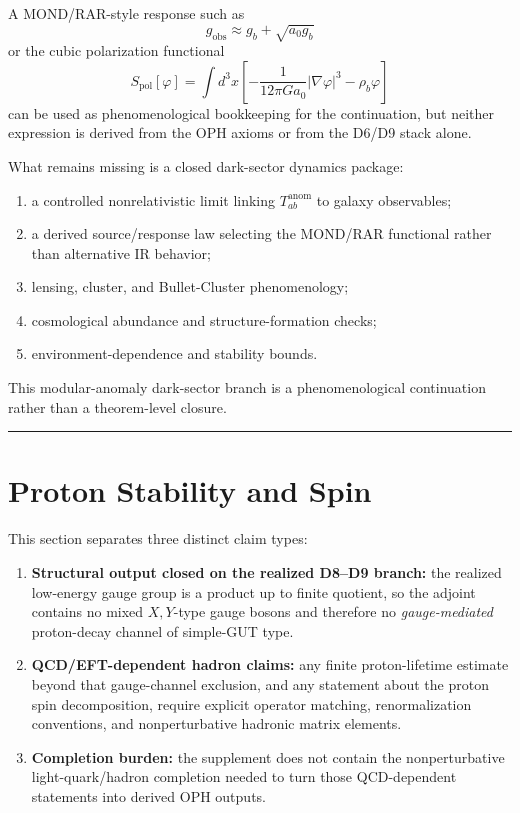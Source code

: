 A MOND/RAR-style response such as \[g_{\text{obs}} \approx g_b + \sqrt{a_0 g_b}\]
or the cubic polarization functional \[S_{\text{pol}}[\varphi] = \int d^3x \left[-\frac{1}{12\pi G a_0}|\nabla\varphi|^3 - \rho_b \varphi\right]\]
can be used as phenomenological bookkeeping for the continuation, but neither expression is derived from the OPH axioms or from the D6/D9 stack alone.

What remains missing is a closed dark-sector dynamics package:
\begin{enumerate}
\item a controlled nonrelativistic limit linking \(T_{ab}^{\text{anom}}\) to galaxy observables;
\item a derived source/response law selecting the MOND/RAR functional rather than alternative IR behavior;
\item lensing, cluster, and Bullet-Cluster phenomenology;
\item cosmological abundance and structure-formation checks;
\item environment-dependence and stability bounds.
\end{enumerate}

This modular-anomaly dark-sector branch is a phenomenological continuation rather than a theorem-level closure.

\begin{center}\rule{0.5\linewidth}{0.5pt}\end{center}

\section{Proton Stability and Spin}\label{10-proton-stability-and-spin}

This section separates three distinct claim types:
\begin{enumerate}
\item \textbf{Structural output closed on the realized D8--D9 branch:} the realized low-energy gauge group is a product up to finite quotient, so the adjoint contains no mixed \(X,Y\)-type gauge bosons and therefore no \emph{gauge-mediated} proton-decay channel of simple-GUT type.
\item \textbf{QCD/EFT-dependent hadron claims:} any finite proton-lifetime estimate beyond that gauge-channel exclusion, and any statement about the proton spin decomposition, require explicit operator matching, renormalization conventions, and nonperturbative hadronic matrix elements.
\item \textbf{Completion burden:} the supplement does not contain the nonperturbative light-quark/hadron completion needed to turn those QCD-dependent statements into derived OPH outputs.
\end{enumerate}

